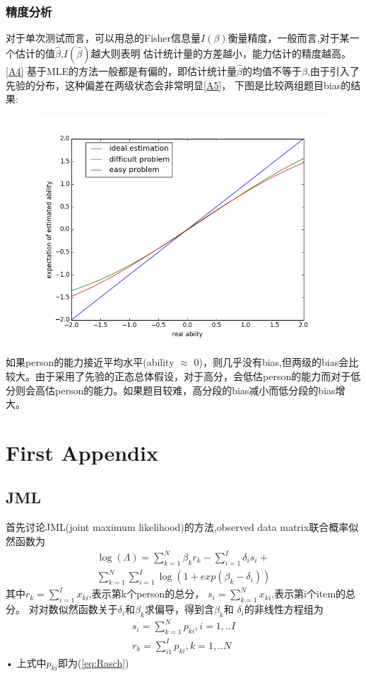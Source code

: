 \documentclass[12pt]{article}
\begin{document}
\subsubsection{精度分析}
对于单次测试而言，可以用总的Fisher信息量$I(\beta)$衡量精度，一般而言,对于某一个估计的值$\hat{\beta}$,$I(\hat{\beta})$越大则表明
估计统计量的方差越小，能力估计的精度越高。\ref{A4}
基于MLE的方法一般都是有偏的，即估计统计量$\hat{\beta}$的均值不等于$\beta$,由于引入了先验的分布，这种偏差在两级状态会非常明显\ref{A5}，
下图是比较两组题目bias的结果:
\begin{figure}[!ht]
\includegraphics[width=\linewidth]{bias.png}
\end{figure}

如果person的能力接近平均水平(ability $\approx$ 0)，则几乎没有bias,但两级的bias会比较大。由于采用了先验的正态总体假设，对于高分，会低估person的能力而对于低分则会高估person的能力。如果题目较难，高分段的bias减小而低分段的bias增大。
\appendix
\section{First Appendix}\label{A1}
\subsection{JML}
首先讨论JML(joint maximum likelihood)的方法,observed data matrix联合概率似然函数为
\begin{equation}
\begin{split}
\log(\Lambda)=\sum_{k=1}^N \beta_k r_k -\sum_{i=1}^I \delta_i s_i+ \\
\sum_{k=1}^N \sum_{i=1}^I \log(1+exp(\beta_k-\delta_i))
\end{split}
\end{equation}
其中$r_k=\displaystyle\sum_{i=1}^I x_{ki}$,表示第k个person的总分，
$s_i=\displaystyle\sum_{k=1}^N x_{ki}$,表示第i个item的总分。
对对数似然函数关于$\delta_i$和$\beta_k$求偏导，得到含$\beta_k$和
$\delta_i$的非线性方程组为
\begin{eqnarray}\label{eq:JML}
s_i=\sum_{k=1}^N p_{ki},i=1,..I\\
r_k=\sum_{i1}^I p_{ki},k=1,..N
\end{eqnarray}•
上式中$p_{ki}$即为(\ref{eq:Rasch})
\end{document}
